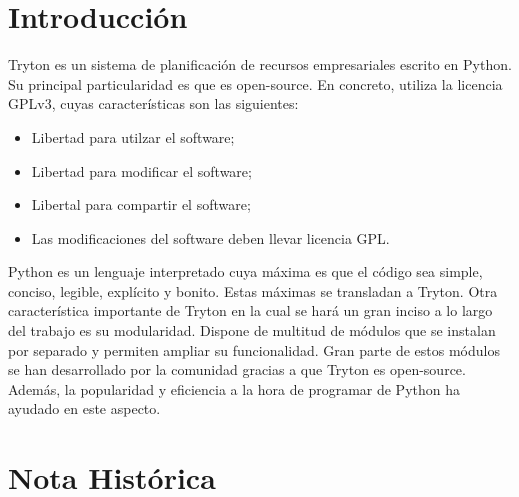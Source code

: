 \documentclass{article}
\begin{document}
\maketitle



\newpage
\tableofcontents
\newpage


\section{Introducción}

Tryton es un sistema de planificación de recursos empresariales escrito en Python. Su principal particularidad es que es open-source. En concreto, utiliza la licencia GPLv3, cuyas características son las siguientes:

\begin{itemize}
    \item Libertad para utilzar el software;
    \item Libertad para modificar el software;
    \item Libertal para compartir el software;
    \item Las modificaciones del software deben llevar licencia GPL.
\end{itemize}

Python es un lenguaje interpretado cuya máxima es que el código sea simple, conciso, legible, explícito y bonito. Estas máximas se transladan a Tryton. Otra característica importante de Tryton en la cual se hará un gran inciso a lo largo del trabajo es su modularidad. Dispone de multitud de módulos que se instalan por separado y permiten ampliar su funcionalidad. Gran parte de estos módulos se han desarrollado por la comunidad gracias a que Tryton es open-source. Además, la popularidad y eficiencia a la hora de programar de Python ha ayudado en este aspecto.

\section{Nota Histórica}
\end{document}
